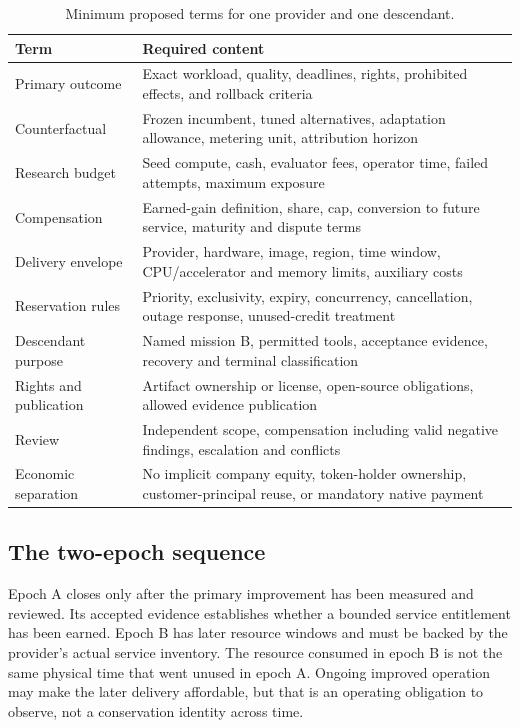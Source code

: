 \documentclass[11pt,letterpaper]{article}
\theoremstyle{remark}\newtheorem{remark}{Remark}[section]
\begin{document}
\begin{table}[htbp]\centering\small
\caption{Minimum proposed terms for one provider and one descendant.}\label{tab:terms}
\begin{tabularx}{\linewidth}{@{}P{.24\linewidth}Y@{}}\toprule
Term & Required content\\\midrule
Primary outcome & Exact workload, quality, deadlines, rights, prohibited effects, and rollback criteria\\
Counterfactual & Frozen incumbent, tuned alternatives, adaptation allowance, metering unit, attribution horizon\\
Research budget & Seed compute, cash, evaluator fees, operator time, failed attempts, maximum exposure\\
Compensation & Earned-gain definition, share, cap, conversion to future service, maturity and dispute terms\\
Delivery envelope & Provider, hardware, image, region, time window, CPU/accelerator and memory limits, auxiliary costs\\
Reservation rules & Priority, exclusivity, expiry, concurrency, cancellation, outage response, unused-credit treatment\\
Descendant purpose & Named mission B, permitted tools, acceptance evidence, recovery and terminal classification\\
Rights and publication & Artifact ownership or license, open-source obligations, allowed evidence publication\\
Review & Independent scope, compensation including valid negative findings, escalation and conflicts\\
Economic separation & No implicit company equity, token-holder ownership, customer-principal reuse, or mandatory native payment\\\bottomrule
\end{tabularx}
\end{table}

\subsection{The two-epoch sequence}
Epoch A closes only after the primary improvement has been measured and reviewed. Its accepted evidence establishes whether a bounded service entitlement has been earned. Epoch B has later resource windows and must be backed by the provider's actual service inventory. The resource consumed in epoch B is not the same physical time that went unused in epoch A. Ongoing improved operation may make the later delivery affordable, but that is an operating obligation to observe, not a conservation identity across time.
\end{document}
